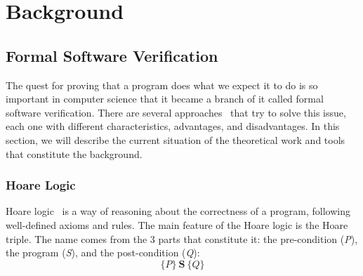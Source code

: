 
%

\newcommand{\provername}[1]{\cellcolor{yellow!25}
\begin{sideways}\textbf{#1}~~\end{sideways}}
\newcommand{\explanation}[1]{\cellcolor{yellow!13}lemma \texttt{#1}}
\newcommand{\transformation}[1]{\cellcolor{yellow!13}transformation \texttt{#1}}
\newcommand{\subgoal}[2]{\cellcolor{yellow!13}subgoal #2}
\newcommand{\valid}[1]{\cellcolor{green!13}#1}
\newcommand{\unknown}[1]{\cellcolor{red!20}#1}
\newcommand{\invalid}[1]{\cellcolor{red!50}#1}
\newcommand{\timeout}[1]{\cellcolor{red!20}(#1)}
\newcommand{\outofmemory}[1]{\cellcolor{red!20}(#1)}
\newcommand{\noresult}{\multicolumn{1}{>{\columncolor[gray]{0.8}}c|}{~}}
\newcommand{\highfailure}{\cellcolor{red!50}FAILURE}

\chapter{Background}
\label{cha:background}

\glsresetall


\section{Formal Software Verification}
\label{sec:formal_software_verification}

The quest for proving that a program does what we expect it to do is so important in computer science that it became a branch of it called formal software verification. 
There are several approaches~\cite{DBLP:conf/fm/BrainP24} that try to solve this issue, each one with different characteristics, advantages, and disadvantages. 
In this section, we will describe the current situation of the theoretical work and tools that constitute the background.


\subsection{Hoare Logic} 
\label{sub:hoare_logic}

Hoare logic~\cite{hoare69} is a way of reasoning about the correctness of a program, following well-defined axioms and rules.
The main feature of the Hoare logic is the Hoare triple. 
The name comes from the 3 parts that constitute it: the pre-condition (\emph{P}), the program (\emph{S}), and the post-condition (\emph{Q}):
\[ \{P\} \ \textbf{S} \ \{Q\} \]

